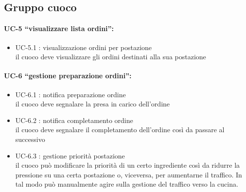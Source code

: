 \subsection{Gruppo cuoco}
\paragraph{UC-5 “visualizzare lista ordini”:}
\begin{itemize}
	\item UC-5.1 : visualizzazione ordini per postazione \\ 
	il cuoco deve visualizzare gli ordini destinati alla sua postazione
\end{itemize}

\paragraph{UC-6 “gestione preparazione ordini”:}
\begin{itemize}
	\item UC-6.1 : notifica preparazione ordine \\ 
	il cuoco deve segnalare la presa in carico dell’ordine
	\item UC-6.2 : notifica completamento ordine \\
	il cuoco deve segnalare il completamento dell’ordine così da passare al successivo
	\item UC-6.3 : gestione priorità postazione \\
	il cuoco può modificare la priorità di un certo ingrediente così da ridurre la pressione su una certa postazione o, viceversa, per aumentarne il traffico. In tal modo può manualmente agire sulla gestione del traffico verso la cucina.
\end{itemize}

\clearpage